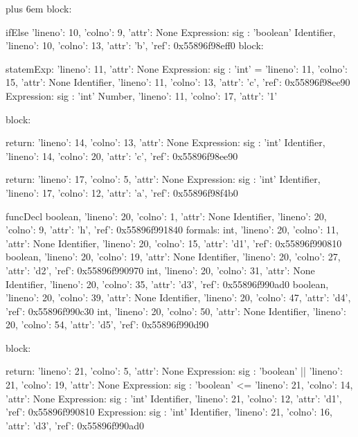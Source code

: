 \documentclass{article}
\makeatletter
\newenvironment{myverb}
 {\def\@xobeysp{\ }\verbatim\rightskip=0pt plus 6em\relax}
 {\endverbatim}
\makeatother
\begin{document}
\begin{itemize}
\begin{myverb}
        block:

          ifElse {'lineno': 10, 'colno': 9, 'attr': None}
            Expression: {sig : 'boolean'}
              Identifier, {'lineno': 10, 'colno': 13, 'attr': 'b', 'ref': 0x55896f98eff0}
            block:

              statemExp: {'lineno': 11, 'attr': None}
                Expression: {sig : 'int'}
                  = {'lineno': 11, 'colno': 15, 'attr': None}
                    Identifier, {'lineno': 11, 'colno': 13, 'attr': 'c', 'ref': 0x55896f98ee90}
                    Expression: {sig : 'int'}
                      Number, {'lineno': 11, 'colno': 17, 'attr': '1'}


            block:

              return: {'lineno': 14, 'colno': 13, 'attr': None}
                Expression: {sig : 'int'}
                  Identifier, {'lineno': 14, 'colno': 20, 'attr': 'c', 'ref': 0x55896f98ee90}

      return: {'lineno': 17, 'colno': 5, 'attr': None}
        Expression: {sig : 'int'}
          Identifier, {'lineno': 17, 'colno': 12, 'attr': 'a', 'ref': 0x55896f98f4b0}

funcDecl
    boolean, {'lineno': 20, 'colno': 1, 'attr': None}
    Identifier, {'lineno': 20, 'colno': 9, 'attr': 'h', 'ref': 0x55896f991840}
      formals:
        int, {'lineno': 20, 'colno': 11, 'attr': None}
        Identifier, {'lineno': 20, 'colno': 15, 'attr': 'd1', 'ref': 0x55896f990810}
        boolean, {'lineno': 20, 'colno': 19, 'attr': None}
        Identifier, {'lineno': 20, 'colno': 27, 'attr': 'd2', 'ref': 0x55896f990970}
        int, {'lineno': 20, 'colno': 31, 'attr': None}
        Identifier, {'lineno': 20, 'colno': 35, 'attr': 'd3', 'ref': 0x55896f990ad0}
        boolean, {'lineno': 20, 'colno': 39, 'attr': None}
        Identifier, {'lineno': 20, 'colno': 47, 'attr': 'd4', 'ref': 0x55896f990c30}
        int, {'lineno': 20, 'colno': 50, 'attr': None}
        Identifier, {'lineno': 20, 'colno': 54, 'attr': 'd5', 'ref': 0x55896f990d90}

    block:

      return: {'lineno': 21, 'colno': 5, 'attr': None}
        Expression: {sig : 'boolean'}
          || {'lineno': 21, 'colno': 19, 'attr': None}
            Expression: {sig : 'boolean'}
              <= {'lineno': 21, 'colno': 14, 'attr': None}
                Expression: {sig : 'int'}
                  Identifier, {'lineno': 21, 'colno': 12, 'attr': 'd1', 'ref': 0x55896f990810}
                Expression: {sig : 'int'}
                  Identifier, {'lineno': 21, 'colno': 16, 'attr': 'd3', 'ref': 0x55896f990ad0}


\end{myverb}
\end{itemize}
\end{document}
